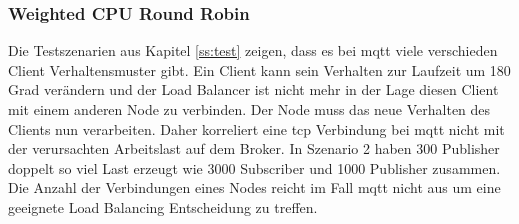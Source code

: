 
\subsubsection{Weighted CPU Round Robin}
Die Testszenarien aus Kapitel \ref{ss:test} zeigen, dass es bei \ac{mqtt} viele verschieden Client Verhaltensmuster gibt. Ein Client kann sein Verhalten zur Laufzeit um 180 Grad verändern und der Load Balancer ist nicht mehr in der Lage diesen Client mit einem anderen Node zu verbinden. Der Node muss das neue Verhalten des Clients nun verarbeiten.
Daher korreliert eine \ac{tcp} Verbindung bei \ac{mqtt} nicht mit der verursachten Arbeitslast auf dem Broker. In Szenario 2 haben 300 Publisher doppelt so viel Last erzeugt wie 3000 Subscriber und 1000 Publisher zusammen.
Die Anzahl der Verbindungen eines Nodes reicht im Fall \ac{mqtt} nicht aus um eine geeignete Load Balancing Entscheidung zu treffen.

